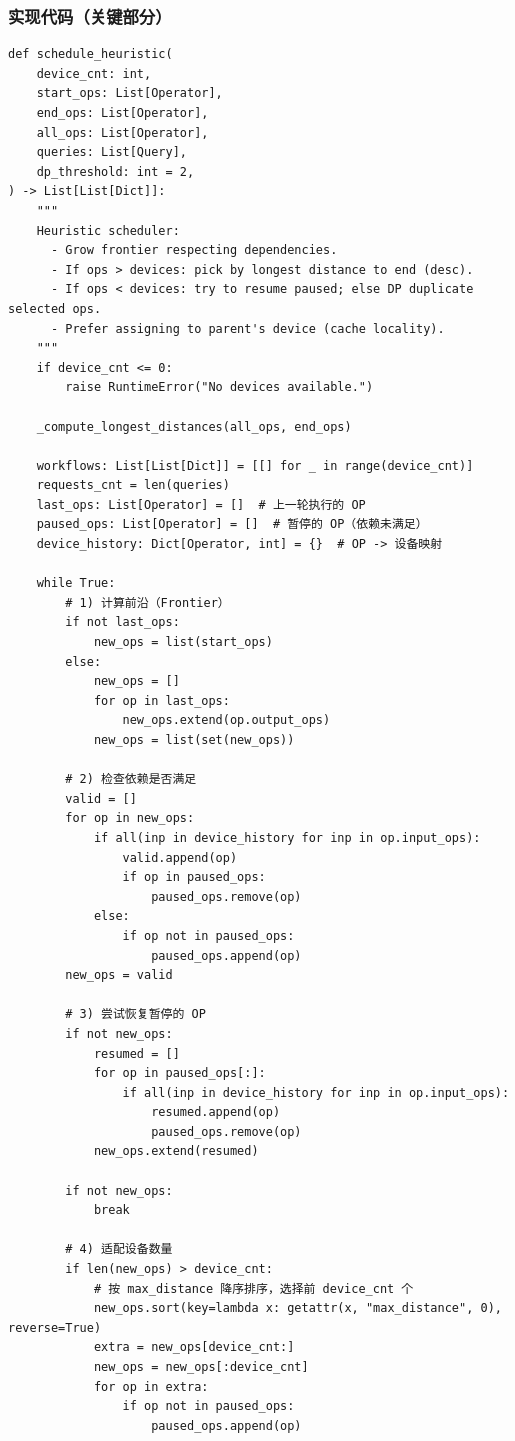 \documentclass[12pt,a4paper]{article}
\begin{document}
\subsubsection{实现代码（关键部分）}

\begin{lstlisting}
def schedule_heuristic(
    device_cnt: int,
    start_ops: List[Operator],
    end_ops: List[Operator],
    all_ops: List[Operator],
    queries: List[Query],
    dp_threshold: int = 2,
) -> List[List[Dict]]:
    """
    Heuristic scheduler:
      - Grow frontier respecting dependencies.
      - If ops > devices: pick by longest distance to end (desc).
      - If ops < devices: try to resume paused; else DP duplicate selected ops.
      - Prefer assigning to parent's device (cache locality).
    """
    if device_cnt <= 0:
        raise RuntimeError("No devices available.")
    
    _compute_longest_distances(all_ops, end_ops)
    
    workflows: List[List[Dict]] = [[] for _ in range(device_cnt)]
    requests_cnt = len(queries)
    last_ops: List[Operator] = []  # 上一轮执行的 OP
    paused_ops: List[Operator] = []  # 暂停的 OP（依赖未满足）
    device_history: Dict[Operator, int] = {}  # OP -> 设备映射
    
    while True:
        # 1) 计算前沿（Frontier）
        if not last_ops:
            new_ops = list(start_ops)
        else:
            new_ops = []
            for op in last_ops:
                new_ops.extend(op.output_ops)
            new_ops = list(set(new_ops))
        
        # 2) 检查依赖是否满足
        valid = []
        for op in new_ops:
            if all(inp in device_history for inp in op.input_ops):
                valid.append(op)
                if op in paused_ops:
                    paused_ops.remove(op)
            else:
                if op not in paused_ops:
                    paused_ops.append(op)
        new_ops = valid
        
        # 3) 尝试恢复暂停的 OP
        if not new_ops:
            resumed = []
            for op in paused_ops[:]:
                if all(inp in device_history for inp in op.input_ops):
                    resumed.append(op)
                    paused_ops.remove(op)
            new_ops.extend(resumed)
        
        if not new_ops:
            break
        
        # 4) 适配设备数量
        if len(new_ops) > device_cnt:
            # 按 max_distance 降序排序，选择前 device_cnt 个
            new_ops.sort(key=lambda x: getattr(x, "max_distance", 0), reverse=True)
            extra = new_ops[device_cnt:]
            new_ops = new_ops[:device_cnt]
            for op in extra:
                if op not in paused_ops:
                    paused_ops.append(op)
        

\end{lstlisting}
\end{document}
